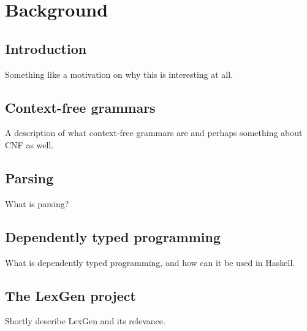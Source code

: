 \chapter{Background}

\section{Introduction}
Something like a motivation on why this is interesting at all.

\section{Context-free grammars}
A description of what context-free grammars are and perhaps something about CNF
as well. 

\section{Parsing}
What is parsing?

\section{Dependently typed programming}
What is dependently typed programming, and how can it be used in Haskell.

\section{The LexGen project}
Shortly describe LexGen and its relevance.

